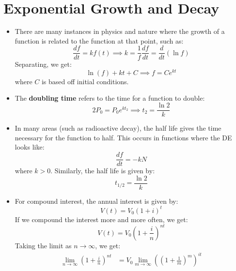 \section{Exponential Growth and Decay}
\begin{itemize}
    \item There are many instances in physics and nature where the growth of a function is related to the function at that point, such as:
    \begin{equation}
        \frac{df}{dt} = kf(t) \implies k =\frac{1}{f}\frac{df}{dt} = \frac{d}{dt}(\ln f)
        \label{eq:}
    \end{equation}
    Separating, we get:
    \begin{equation}
        \ln(f) + kt + C \implies f = Ce^{kt}
        \label{eq:}
    \end{equation}
    where $C$ is based off initial conditions.
    \item The \textbf{doubling time} refers to the time for a function to double:
    \begin{equation}
        2P_0 = P_0 e^{kt_2} \implies t_2 = \frac{\ln 2}{k}
        \label{eq:}
    \end{equation}
    \item In many areas (such as radioactive decay), the half life gives the time necessary for the function to half. This occurs in functions where the DE looks like:
    \begin{equation}
        \frac{df}{dt} = -kN
        \label{eq:}
    \end{equation}
    where $k>0$. Similarly, the half life is given by:
    \begin{equation}
        t_{1/2} = \frac{\ln 2}{k}
        \label{eq:}
    \end{equation}
    \item For compound interest, the annual interest is given by:
    \begin{equation}
        V(t) = V_0(1+i)^t
        \label{eq:}
    \end{equation}
    If we compound the interest more and more often, we get:
    \begin{equation}
        V(t) = V_0\left(1+\frac{i}{n}\right)^{nt}
        \label{eq:}
    \end{equation}
    Taking the limit as $n\to \infty$, we get:
    \begin{align}
        \lim_{n\to\infty} \left(1+\frac{i}{n}\right)^{nt} &= V_0\lim_{m\to \infty} \left(\left(1+\frac{1}{m}\right)^m\right)^{it} \\ 

\end{align}
\end{itemize}
